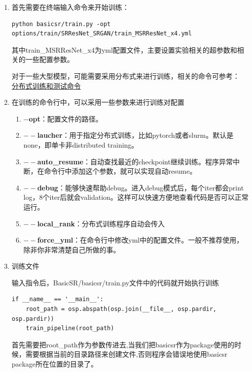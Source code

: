 \documentclass[../main.tex]{subfiles}
\begin{document}
\begin{enumerate}
    \item 首先需要在终端输入命令来开始训练：

\begin{verbatim}
python basicsr/train.py -opt options/train/SRResNet_SRGAN/train_MSRResNet_x4.yml
\end{verbatim}
    
    其中train\_MSRResNet\_x4为yml配置文件，主要设置实验相关的超参数和相关的一些配置参数。
    
    对于一些大型模型，可能需要采用分布式来进行训练，相关的命令可参考：
    \href{https://github.com/XPixelGroup/BasicSR/blob/master/docs/TrainTest.md}{分布式训练和测试命令}

    \item 在训练的命令行中，可以采用一些参数来进行训练对配置

    \begin{enumerate}
    \item \textbf{$-$opt}：配置文件的路径。
    \item \textbf{$--$laucher}：用于指定分布式训练，比如pytorch或者slurm。默认是none，即单卡非distributed training。
    \item \textbf{$--$auto\_resume}：自动查找最近的checkpoint继续训练。程序异常中断，在命令行中添加这个参数，就可以实现自动resume。
    \item \textbf{$--$debug}：能够快速帮助debug。进入debug模式后，每个iter都会print log，8个iter后就会validation。这样可以快速方便地查看代码是否可以正常运行。
    \item \textbf{$--$local\_rank}：分布式训练程序自动会传入
    \item \textbf{$--$force\_yml}：在命令行中修改yml中的配置文件。一般不推荐使用，除非你非常清楚自己所做的事。
    \end{enumerate}

\item 训练文件

输入指令后，BasicSR/basicsr/train.py文件中的代码就开始执行训练
\begin{verbatim}
if __name__ == '__main__':
    root_path = osp.abspath(osp.join(__file__, osp.pardir, osp.pardir))
    train_pipeline(root_path)
\end{verbatim}
首先需要把root\_path作为参数传进去,当我们把basicsr作为package使用的时候，需要根据当前的目录路径来创建文件,否则程序会错误地使用basicsr package所在位置的目录了。


\end{enumerate}
\end{document}
